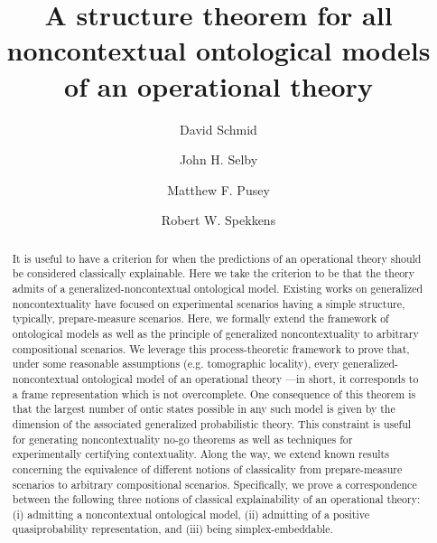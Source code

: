 \documentclass[10pt,twocolumn,aps,groupedaddress,nofootinbib]{revtex4}
\begin{document}
\title{A structure theorem for all noncontextual ontological models of an operational theory}
\author{David Schmid}
\author{John H. Selby}
\author{Matthew F. Pusey}
\author{Robert W. Spekkens}
\begin{abstract}
It is useful to have a criterion for when the predictions of an operational theory should be considered classically explainable.  Here we take the criterion to be that the theory
admits of
 a generalized-noncontextual ontological model. Existing works on generalized noncontextuality have focused on experimental scenarios having a simple structure, typically, prepare-measure scenarios.
 Here, we formally extend the framework of ontological models as well as the principle of generalized noncontextuality to arbitrary compositional scenarios.
We leverage this process-theoretic framework to prove that, under some reasonable assumptions (e.g. tomographic locality),  every generalized-noncontextual ontological model of an operational theory 
---in short, it corresponds to a frame representation which is not overcomplete. 
One consequence of this theorem is that the largest number of ontic states possible in any such model is given by the dimension of the associated generalized probabilistic theory. This constraint is useful for generating noncontextuality no-go theorems as well as techniques for experimentally certifying contextuality.
Along the way, we extend known results concerning the equivalence of different notions of classicality from prepare-measure scenarios to arbitrary compositional scenarios.
Specifically, we prove a correspondence between
 the following three notions of classical explainability of an operational theory: (i) admitting a noncontextual ontological model, (ii) admitting of a positive quasiprobability representation, and (iii) being simplex-embeddable.
\end{abstract}
\end{document}
